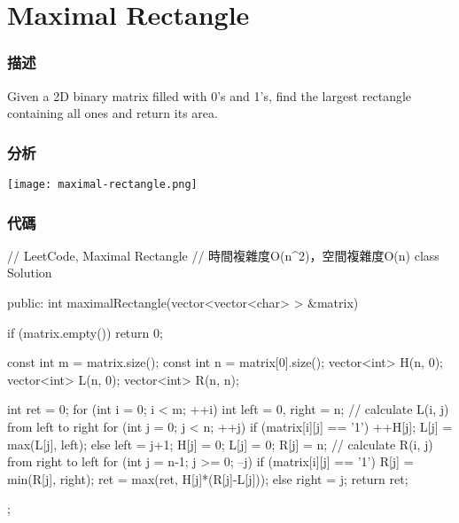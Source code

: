 \section{Maximal Rectangle} %
\label{sec:maximal-rectangle}


\subsubsection{描述}
Given a 2D binary matrix filled with 0's and 1's, find the largest rectangle containing all ones and return its area.


\subsubsection{分析}
\begin{center}
\texttt{[image: maximal-rectangle.png]}\\
\label{fig:maximal-rectangle}
\end{center}



\subsubsection{代碼}
\begin{Code}
// LeetCode, Maximal Rectangle
// 時間複雜度O(n^2)，空間複雜度O(n)
class Solution {
public:
    int maximalRectangle(vector<vector<char> > &matrix) {
        if (matrix.empty())  return 0;

        const int m = matrix.size();
        const int n = matrix[0].size();
        vector<int> H(n, 0);
        vector<int> L(n, 0);
        vector<int> R(n, n);

        int ret = 0;
        for (int i = 0; i < m; ++i) {
            int left = 0, right = n;
            // calculate L(i, j) from left to right
            for (int j = 0; j < n; ++j) {
                if (matrix[i][j] == '1') {
                    ++H[j];
                    L[j] = max(L[j], left);
                } else {
                    left = j+1;
                    H[j] = 0; L[j] = 0; R[j] = n;
                }
            }
            // calculate R(i, j) from right to left
            for (int j = n-1; j >= 0; --j) {
                if (matrix[i][j] == '1') {
                    R[j] = min(R[j], right);
                    ret = max(ret, H[j]*(R[j]-L[j]));
                } else {
                    right = j;
                }
            }
        }
        return ret;
    }
};
\end{Code}


